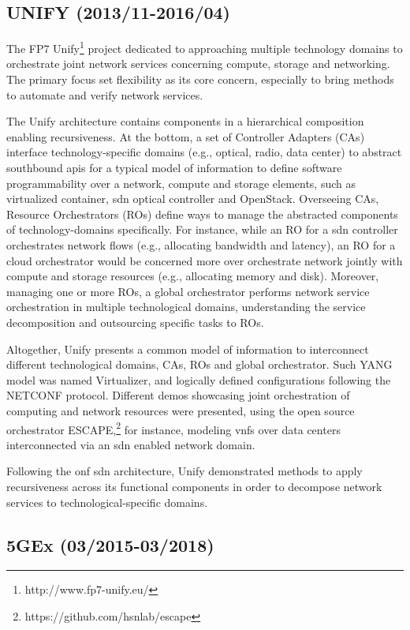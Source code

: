 \subsection{UNIFY (2013/11-2016/04)}

The FP7 Unify\footnote{http://www.fp7-unify.eu/} project dedicated to approaching multiple technology domains to orchestrate joint network services concerning compute, storage and networking. The primary focus set flexibility as its core concern, especially to bring methods to automate and verify network services.

The Unify architecture contains components in a hierarchical composition enabling recursiveness.  At the bottom, a set of Controller Adapters (CAs) interface technology-specific domains (e.g., optical, radio, data center) to abstract southbound \glspl{api} for a typical model of information to define software programmability over a network, compute and storage elements, such as virtualized container, \gls{sdn} optical controller and OpenStack.   
Overseeing CAs, Resource Orchestrators (ROs) define ways to manage the abstracted components of technology-domains specifically. For instance, while an RO for a \gls{sdn} controller orchestrates network flows (e.g., allocating bandwidth and latency), an RO for a cloud orchestrator would be concerned more over orchestrate network jointly with compute and storage resources (e.g., allocating memory and disk). Moreover, managing one or more ROs, a global orchestrator performs network service orchestration in multiple technological domains, understanding the service decomposition and outsourcing specific tasks to ROs.

Altogether, Unify presents a common model of information to interconnect different technological domains, CAs, ROs and global orchestrator. Such YANG model was named Virtualizer, and logically defined configurations following the NETCONF protocol. 
Different demos showcasing joint orchestration of computing and network resources were presented, using the open source orchestrator ESCAPE,\footnote{https://github.com/hsnlab/escape} for instance, modeling \glspl{vnf} over data centers interconnected via an \gls{sdn} enabled network domain.

Following the \gls{onf} \gls{sdn} architecture, Unify demonstrated methods to apply recursiveness across its functional components in order to decompose network services to technological-specific domains. 

\subsection{5GEx (03/2015-03/2018) } 

